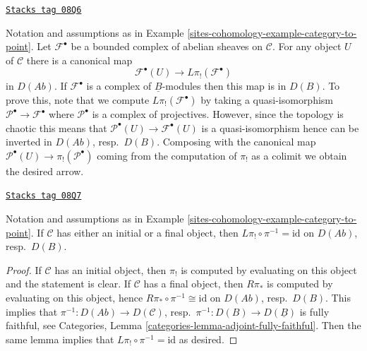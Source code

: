 \begin{remark}
\label{sites-cohomology-remark-map-evaluation-to-derived}
\href{https://stacks.math.columbia.edu/tag/08Q6}{\texttt{Stacks tag 08Q6}}

Notation and assumptions as in Example \ref{sites-cohomology-example-category-to-point}.
Let $\mathcal{F}^\bullet$ be a bounded complex of abelian sheaves on
$\mathcal{C}$. For any object $U$ of $\mathcal{C}$ there is a canonical
map
$$
\mathcal{F}^\bullet(U) \longrightarrow L\pi_!(\mathcal{F}^\bullet)
$$
in $D(\textit{Ab})$. If $\mathcal{F}^\bullet$ is a complex of
$\underline{B}$-modules then this map is in $D(B)$. To prove this, note
that we compute $L\pi_!(\mathcal{F}^\bullet)$ by taking a quasi-isomorphism
$\mathcal{P}^\bullet \to \mathcal{F}^\bullet$ where $\mathcal{P}^\bullet$
is a complex of projectives. However, since the topology is chaotic
this means that $\mathcal{P}^\bullet(U) \to \mathcal{F}^\bullet(U)$
is a quasi-isomorphism hence can be inverted in
$D(\textit{Ab})$, resp.\ $D(B)$. Composing with the canonical map
$\mathcal{P}^\bullet(U) \to \pi_!(\mathcal{P}^\bullet)$ coming from
the computation of $\pi_!$ as a colimit we obtain the desired arrow.
\end{remark}

\begin{lemma}
\label{sites-cohomology-lemma-initial-final}
\href{https://stacks.math.columbia.edu/tag/08Q7}{\texttt{Stacks tag 08Q7}}

Notation and assumptions as in Example \ref{sites-cohomology-example-category-to-point}.
If $\mathcal{C}$ has either an initial or a final object, then
$L\pi_! \circ \pi^{-1} = \text{id}$ on $D(\textit{Ab})$, resp.\ $D(B)$.
\end{lemma}

\begin{proof}
If $\mathcal{C}$ has an initial object, then $\pi_!$ is computed by
evaluating on this object and the statement is clear. If $\mathcal{C}$
has a final object, then $R\pi_*$ is computed by evaluating on this
object, hence $R\pi_* \circ \pi^{-1} \cong \text{id}$ on
$D(\textit{Ab})$, resp.\ $D(B)$. This implies that
$\pi^{-1} : D(\textit{Ab}) \to D(\mathcal{C})$,
resp.\ $\pi^{-1} : D(B) \to D(\underline{B})$ is fully faithful, see
Categories, Lemma \ref{categories-lemma-adjoint-fully-faithful}.
Then the same lemma implies that $L\pi_! \circ \pi^{-1} = \text{id}$
as desired.
\end{proof}

